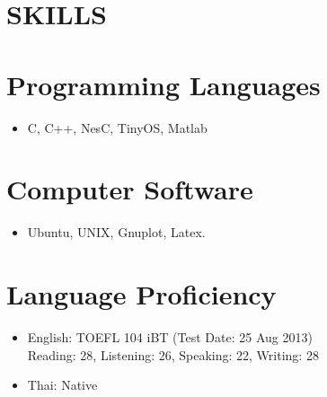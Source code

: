 \documentclass[margin]{res}
\begin{document}
\begin{resume}
\section{SKILLS} 
\normalsize{\section{Programming Languages}}
                 \begin{itemize}
                 \item C, C++, NesC, TinyOS, Matlab
                 \end{itemize}
\normalsize{\section{Computer Software}} 
                 \begin{itemize}
                  \item Ubuntu, UNIX, Gnuplot, Latex. 
                  \end{itemize}
\normalsize{\section{Language Proficiency}}
	           \begin{itemize} 
                   \item English: TOEFL 104 iBT  (Test Date: 25 Aug 2013) \\ Reading: 28, Listening: 26, Speaking: 22, Writing: 28
                  \item Thai: Native 
                   \end{itemize}


\end{resume}
\end{document}
